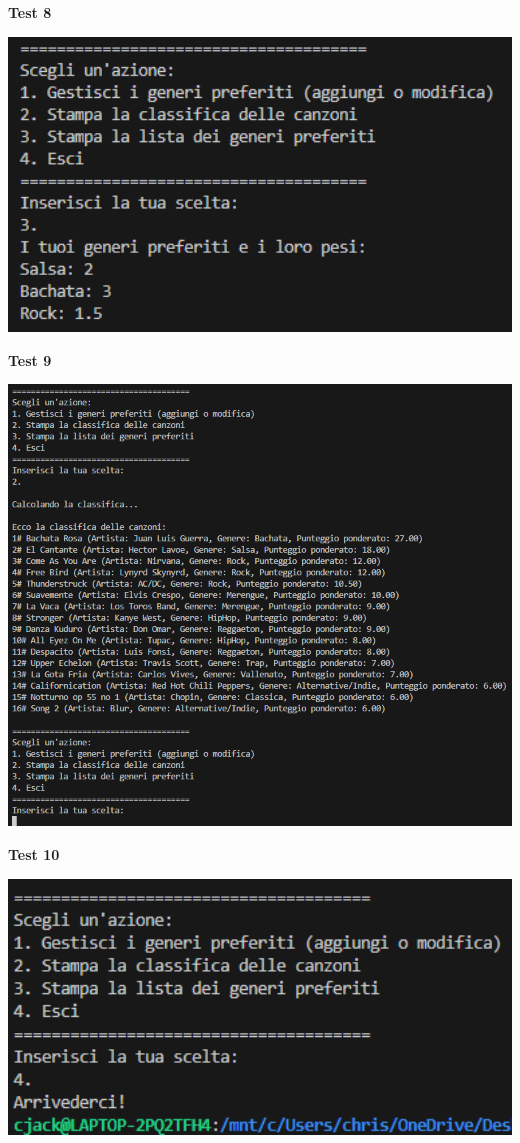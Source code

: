 \documentclass[a4paper,11pt]{article}
\begin{document}
    \newpage
    \begin{center}
        \textbf{Test 8}
        \par
        \vspace{0.5cm}
        \includegraphics[width=1\textwidth]{Immagini/Tests/ptest8}
    \end{center}
    \begin{center}
        \textbf{Test 9}
        \par
        \vspace{0.5cm}
        \includegraphics[width=1\textwidth]{Immagini/Tests/ptest9}
    \end{center}
    \begin{center}
        \textbf{Test 10}
        \par
        \vspace{0.5cm}
        \includegraphics[width=1\textwidth]{Immagini/Tests/ptest10}
    \end{center}
    \vspace{1cm}
\end{document}
